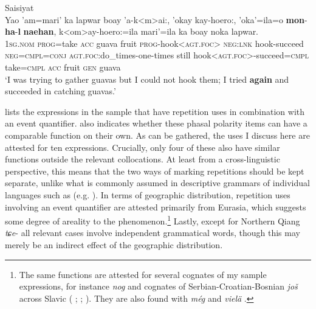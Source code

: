 \begin{exe}
	\ex Saisiyat\label{exIterativeIncrementSaisiyat}\\
		\gll Yao \rq{}am=mari’ ka lapwar boay \rq{}a-k<m>ai:, \rq{}okay kay-hoero:, \rq{}oka\rq{}=ila=o \textbf{mon}-\textbf{ha}-\textbf{l} \textbf{naehan}, k<om>ay-hoero:=ila mari\rq{}=ila ka boay noka lapwar.\\
1\textsc{sg}.\textsc{nom} \textsc{prog}=take \textsc{acc} guava fruit \textsc{prog}-hook<\textsc{agt}.\textsc{foc}> \textsc{neg}:\textsc{lnk} hook-succeed \textsc{neg}=\textsc{cmpl}=\textsc{conj} \textsc{agt}.\textsc{foc}:do\_times-one-times still hook<\textsc{agt}.\textsc{foc}>-succeed=\textsc{cmpl} take=\textsc{cmpl} \textsc{acc} fruit \textsc{gen} guava\\
\glt \lq I was trying to gather guavas but I could not hook them; I tried \textbf{again} and succeeded in catching guavas.'  \parencite[524]{ZeitounEtal2015}
\end{exe}

 lists the expressions in the sample that have repetition uses in combination with an event quantifier.  also indicates whether these phasal polarity items can have a comparable function on their own. As can be gathered, the uses I discuss here are attested for ten expressions. Crucially, only four of these also have similar functions outside the relevant collocations. At least from a cross-linguistic perspective, this means that the two ways of marking repetitions should be kept separate, unlike what is commonly assumed in descriptive grammars of individual languages such as  (e.g. \cite[535]{BatchelorChebliSaadi2011}). In terms of geographic distribution, repetition uses involving an event quantifier are attested primarily from Eurasia, which suggests some degree of areality to the phenomenon.\footnote{The same functions are attested for several cognates of my sample expressions, for instance  \textit{nog} \parencite[145]{Koenig1991} and cognates of Serbian\hyp Croatian\hyp Bosnian \textit{još} across Slavic (\cite[s.v. \textit{ešte}]{SSSJ}  \cite[s.v. \textit{ještě}]{SSJC}; \cite[s.v. \textit{ešte}]{KSS4}; \cite{Mustajoki1988}). They are also found with  \textit{még} \parencite[s.v. \textit{még}]{BarcziOrszagh1992} and  \textit{vielä} \parencite[145]{Koenig1991}.}  Lastly, except for Northern Qiang \mbox{\textit{tɕe}-} all relevant cases involve independent grammatical words, though this may merely be an indirect effect of the geographic distribution.

